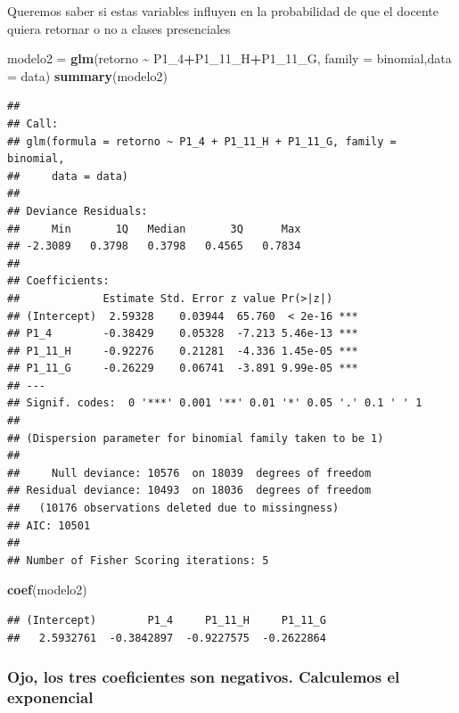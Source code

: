 \documentclass[
]{article}
\newenvironment{Shaded}{\begin{snugshade}}{\end{snugshade}}
\newcommand{\AttributeTok}[1]{\textcolor[rgb]{0.13,0.29,0.53}{#1}}
\newcommand{\FunctionTok}[1]{\textcolor[rgb]{0.13,0.29,0.53}{\textbf{#1}}}
\newcommand{\NormalTok}[1]{#1}
\newcommand{\OtherTok}[1]{\textcolor[rgb]{0.56,0.35,0.01}{#1}}
\newcommand{\SpecialCharTok}[1]{\textcolor[rgb]{0.81,0.36,0.00}{\textbf{#1}}}
\begin{document}
Queremos saber si estas variables influyen en la probabilidad de que el
docente quiera retornar o no a clases presenciales

\begin{Shaded}
\begin{Highlighting}[]
\NormalTok{modelo2 }\OtherTok{=} \FunctionTok{glm}\NormalTok{(retorno }\SpecialCharTok{\textasciitilde{}}\NormalTok{ P1\_4}\SpecialCharTok{+}\NormalTok{P1\_11\_H}\SpecialCharTok{+}\NormalTok{P1\_11\_G, }\AttributeTok{family =}\NormalTok{ binomial,}\AttributeTok{data =}\NormalTok{ data)}
\FunctionTok{summary}\NormalTok{(modelo2)}
\end{Highlighting}
\end{Shaded}

\begin{verbatim}
## 
## Call:
## glm(formula = retorno ~ P1_4 + P1_11_H + P1_11_G, family = binomial, 
##     data = data)
## 
## Deviance Residuals: 
##     Min       1Q   Median       3Q      Max  
## -2.3089   0.3798   0.3798   0.4565   0.7834  
## 
## Coefficients:
##             Estimate Std. Error z value Pr(>|z|)    
## (Intercept)  2.59328    0.03944  65.760  < 2e-16 ***
## P1_4        -0.38429    0.05328  -7.213 5.46e-13 ***
## P1_11_H     -0.92276    0.21281  -4.336 1.45e-05 ***
## P1_11_G     -0.26229    0.06741  -3.891 9.99e-05 ***
## ---
## Signif. codes:  0 '***' 0.001 '**' 0.01 '*' 0.05 '.' 0.1 ' ' 1
## 
## (Dispersion parameter for binomial family taken to be 1)
## 
##     Null deviance: 10576  on 18039  degrees of freedom
## Residual deviance: 10493  on 18036  degrees of freedom
##   (10176 observations deleted due to missingness)
## AIC: 10501
## 
## Number of Fisher Scoring iterations: 5
\end{verbatim}

\begin{Shaded}
\begin{Highlighting}[]
\FunctionTok{coef}\NormalTok{(modelo2)}
\end{Highlighting}
\end{Shaded}

\begin{verbatim}
## (Intercept)        P1_4     P1_11_H     P1_11_G 
##   2.5932761  -0.3842897  -0.9227575  -0.2622864
\end{verbatim}

\hypertarget{ojo-los-tres-coeficientes-son-negativos.-calculemos-el-exponencial}{%
\subsubsection{Ojo, los tres coeficientes son negativos. Calculemos el
exponencial}\label{ojo-los-tres-coeficientes-son-negativos.-calculemos-el-exponencial}}
\end{document}
